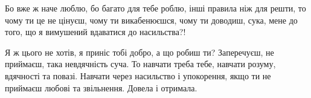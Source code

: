 Бо вже ж наче люблю, бо багато для тебе роблю, інші правила ніж для решти, то
чому ти це не цінуєш, чому ти викабенюєшся, чому ти доводиш, сука, мене до
того, що я вимушений вдаватися до насильства?! 

Я ж цього не хотів, я приніс тобі добро, а що робиш ти? Заперечуєш, не
приймаєш, така невдячність суча. То навчати треба тебе, навчати розуму,
вдячності та повазі. Навчати через насильство і упокорення, якщо ти не приймаєш
любові та звільнення. Довела і отримала.


